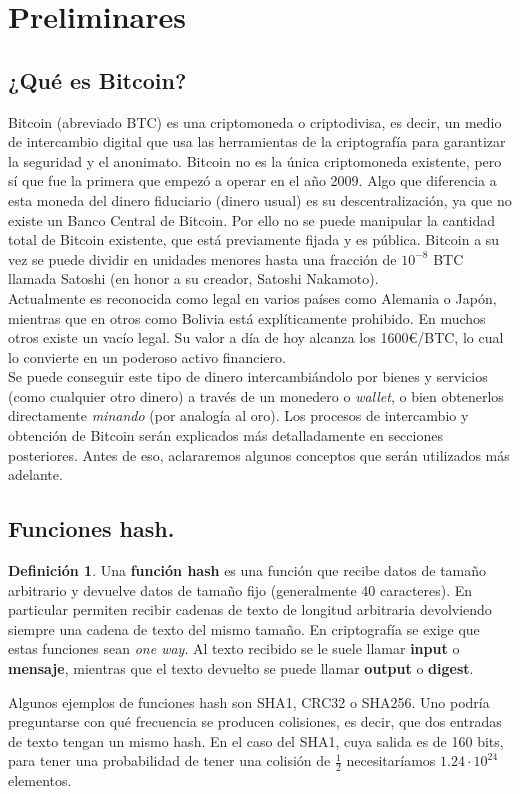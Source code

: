 \documentclass[twoside]{article}
\theoremstyle{definition}
\newtheorem{defi}[teorema]{Definición}
\begin{document}
\newpage


\section{Preliminares}

\subsection{¿Qué es Bitcoin?}

Bitcoin (abreviado BTC) es una criptomoneda o criptodivisa, es decir, un medio de intercambio digital que usa las herramientas de la criptografía para garantizar la seguridad y el anonimato. Bitcoin no es la única criptomoneda existente, pero sí que fue la primera que empezó a operar en el año 2009. Algo que diferencia a esta moneda del dinero fiduciario (dinero usual) es su descentralización, ya que no existe un Banco Central de Bitcoin. Por ello no se puede manipular la cantidad total de Bitcoin existente, que está previamente fijada y es pública. Bitcoin a su vez se puede dividir en unidades menores hasta una fracción de $10^{-8}$ BTC llamada Satoshi (en honor a su creador, Satoshi Nakamoto).\\

Actualmente es reconocida como legal en varios países como Alemania o Japón, mientras que en otros como Bolivia está explíticamente prohibido. En muchos otros existe un vacío legal. Su valor a día de hoy alcanza los 1600\euro/BTC, lo cual lo convierte en un poderoso activo financiero. \\

Se puede conseguir este tipo de dinero intercambiándolo por bienes y servicios (como cualquier otro dinero) a través de un monedero o \emph{wallet}, o bien obtenerlos directamente \emph{minando} (por analogía al oro). Los procesos de intercambio y obtención de Bitcoin serán explicados más detalladamente en secciones posteriores. Antes de eso, aclararemos algunos conceptos que serán utilizados más adelante. 

\subsection{Funciones hash.}
\begin{defi}
Una \textbf{función hash} es una función que recibe datos de tamaño arbitrario y devuelve datos de tamaño fijo (generalmente 40 caracteres). En particular permiten recibir cadenas de texto de longitud arbitraria devolviendo siempre una cadena de texto del mismo tamaño. En criptografía se exige que estas funciones sean \emph{one way}. Al texto recibido se le suele llamar \textbf{input} o \textbf{mensaje}, mientras que el texto devuelto se puede llamar \textbf{output} o \textbf{digest}.
\end{defi}
Algunos ejemplos de funciones hash son SHA1, CRC32 o SHA256. Uno podría preguntarse con qué frecuencia se producen colisiones, es decir, que dos entradas de texto tengan un mismo hash. En el caso del SHA1, cuya salida es de 160 bits, para tener una probabilidad de tener una colisión de $\frac{1}{2}$ necesitaríamos $1.24\cdot 10^{24}$ elementos.
\end{document}
